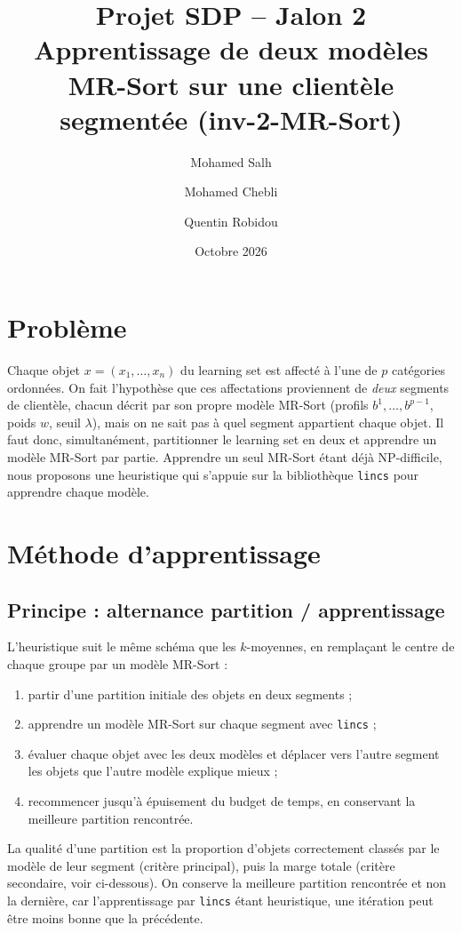 \documentclass[11pt,a4paper]{article}
\title{Projet SDP -- Jalon 2\\[2pt]\large Apprentissage de deux modèles MR-Sort sur une clientèle segmentée (inv-2-MR-Sort)}
\author{Mohamed Salh \and Mohamed Chebli \and Quentin Robidou}
\date{Octobre 2026}
\begin{document}
\maketitle

\section{Problème}

Chaque objet $x=(x_1,\dots,x_n)$ du learning set est affecté à l'une de $p$ catégories ordonnées. On fait
l'hypothèse que ces affectations proviennent de \emph{deux} segments de clientèle, chacun décrit par son propre
modèle MR-Sort (profils $b^1,\dots,b^{p-1}$, poids $w$, seuil $\lambda$), mais on ne sait pas à quel segment
appartient chaque objet. Il faut donc, simultanément, partitionner le learning set en deux et apprendre un
modèle MR-Sort par partie. Apprendre un seul MR-Sort étant déjà NP-difficile, nous proposons une heuristique
qui s'appuie sur la bibliothèque \texttt{lincs} pour apprendre chaque modèle.

\section{Méthode d'apprentissage}

\subsection{Principe : alternance partition / apprentissage}

L'heuristique suit le même schéma que les $k$-moyennes, en remplaçant le centre de chaque groupe par un modèle
MR-Sort :
\begin{enumerate}
  \item partir d'une partition initiale des objets en deux segments ;
  \item apprendre un modèle MR-Sort sur chaque segment avec \texttt{lincs} ;
  \item évaluer chaque objet avec les deux modèles et déplacer vers l'autre segment les objets que l'autre
        modèle explique mieux ;
  \item recommencer jusqu'à épuisement du budget de temps, en conservant la meilleure partition rencontrée.
\end{enumerate}
La qualité d'une partition est la proportion d'objets correctement classés par le modèle de leur segment
(critère principal), puis la marge totale (critère secondaire, voir ci-dessous). On conserve la meilleure
partition rencontrée et non la dernière, car l'apprentissage par \texttt{lincs} étant heuristique, une
itération peut être moins bonne que la précédente.
\end{document}

